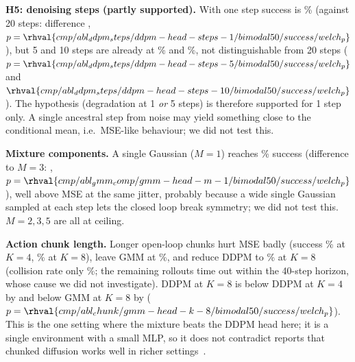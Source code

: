\textbf{H5: denoising steps (partly supported).} With one step success is \% (against 20 steps: difference , $p=\rhval{cmp/abl_ddpm_steps/ddpm-head-steps-1/bimodal50/success/welch_p}$), but 5 and 10 steps are already at \% and \%, not distinguishable from 20 steps ($p=\rhval{cmp/abl_ddpm_steps/ddpm-head-steps-5/bimodal50/success/welch_p}$ and $\rhval{cmp/abl_ddpm_steps/ddpm-head-steps-10/bimodal50/success/welch_p}$). The hypothesis (degradation at 1 \emph{or} 5 steps) is therefore supported for 1 step only. A single ancestral step from noise may yield something close to the conditional mean, i.e.\ MSE-like behaviour; we did not test this.

\begin{table}[t]\centering\caption{GMM components (\texttt{bimodal50}, 5 seeds; $M=2$ is in Table~\ref{tab:main}).}\label{tab:comp}
\resizebox{\columnwidth}{!}{}\end{table}

\textbf{Mixture components.} A single Gaussian ($M=1$) reaches \% success (difference to $M=3$: , $p=\rhval{cmp/abl_gmm_comp/gmm-head-m-1/bimodal50/success/welch_p}$), well above MSE at the same jitter, probably because a wide single Gaussian sampled at each step lets the closed loop break symmetry; we did not test this. $M=2,3,5$ are all at ceiling.

\begin{table}[t]\centering\caption{Action-chunk length $K$ (open-loop execution), \texttt{bimodal50}, 5 seeds; $K=1$ is the main setting.}\label{tab:chunk}
\resizebox{\columnwidth}{!}{}\end{table}

\textbf{Action chunk length.} Longer open-loop chunks hurt MSE badly (success \% at $K=4$, \% at $K=8$), leave GMM at \%, and reduce DDPM to \% at $K=8$ (collision rate only \%; the remaining rollouts time out within the 40-step horizon, whose cause we did not investigate). DDPM at $K=8$ is below DDPM at $K=4$ by  and below GMM at $K=8$ by  ($p=\rhval{cmp/abl_chunk/gmm-head-k-8/bimodal50/success/welch_p}$). This is the one setting where the mixture beats the DDPM head here; it is a single environment with a small MLP, so it does not contradict reports that chunked diffusion works well in richer settings~\cite{chi2023diffusion}.

